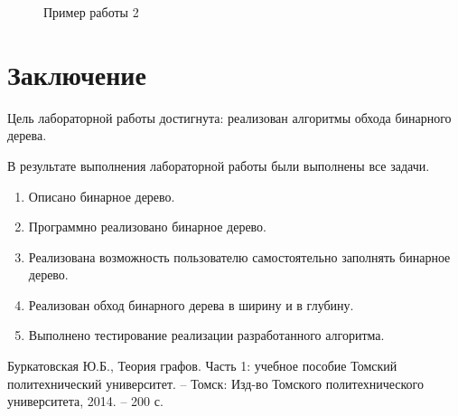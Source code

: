 \documentclass[12pt, a4paper]{article}
\begin{document}
\begin{enumerate}
\begin{figure}[h]
  		\caption{Пример работы 2}
  		\label{img:grap4}
	\end{figure}
\end{enumerate}
\newpage
\section*{Заключение}
Цель лабораторной работы достигнута: реализован алгоритмы обхода бинарного дерева.

В результате выполнения лабораторной работы были выполнены все задачи.
\begin{enumerate}
\item Описано бинарное дерево.
\item Программно реализовано бинарное дерево.
\item Реализована возможность пользователю самостоятельно заполнять бинарное дерево.
\item Реализован обход бинарного дерева в ширину и в глубину.
\item Выполнено тестирование реализации разработанного алгоритма.
\end{enumerate}
\newpage
\begin{center}
\begin{thebibliography}{}
Буркатовская Ю.Б., Теория графов. Часть 1: учебное пособие Томский 
политехнический университет. – Томск: Изд-во Томского политехнического 
университета, 2014. – 200 с.
\end{thebibliography}
\end{center}
\end{document}
